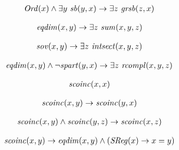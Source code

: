 \begin{erin}
    \begin{align*}
        \mathit{Ord}(x) \wedge \exists y\ \mathit{sb}(y,x) \to \exists z\ \mathit{gr\hspace*{-0.25ex}sb}(z,x)
    \end{align*}
\end{erin}

\begin{erin}
    \begin{align*}
        \mathit{eqdim}(x,y) \to \exists z\ \mathit{sum}(x,y,z)
    \end{align*}
\end{erin}

\begin{erin}
    \begin{align*}
        \mathit{sov}(x,y) \to \exists z\ \mathit{intsect}(x,y,z)
    \end{align*}
\end{erin}

\begin{erin}
    \begin{align*}
        \Geqdim(x,y) \wedge \neg\Gspart(y,x) \to \exists z\ \Grelcompl(x,y,z)
    \end{align*}
\end{erin}

\begin{dfn}
    \begin{align*}
        \mathit{scoinc}(x,x)
    \end{align*}
\end{dfn}

\begin{erin}
    \begin{align*}
        \mathit{scoinc}(x,y) \to \mathit{scoinc}(y,x)
    \end{align*}
\end{erin}

\begin{erin}
    \begin{align*}
        \mathit{scoinc}(x,y) \wedge \mathit{scoinc}(y,z) \to \mathit{scoinc}(x,z)
    \end{align*}
\end{erin}

\begin{dfn}
    \begin{align*}
        \mathit{scoinc}(x,y) \to \mathit{eqdim}(x,y) \wedge (\mathit{S\hspace*{-0.25ex}Reg}(x) \to x=y)
    \end{align*}
\end{dfn}

